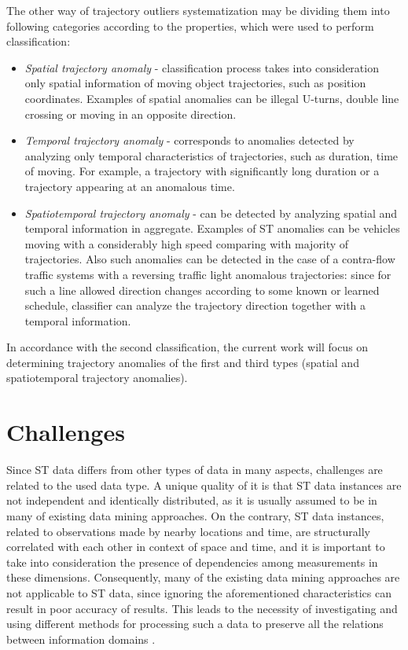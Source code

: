 The other way of trajectory outliers systematization may be dividing them into following categories according to the properties, which were used to perform classification: 
\begin{itemize}
	\item \textit{Spatial trajectory anomaly} - classification process takes into consideration only spatial information of moving object trajectories, such as position coordinates. Examples of spatial anomalies can be illegal U-turns, double line crossing or moving in an opposite direction.
	\item \textit{Temporal trajectory anomaly} - corresponds to anomalies detected by analyzing only temporal characteristics of trajectories, such as duration, time of moving. For example, a trajectory with significantly long duration or a trajectory appearing at an anomalous time.
	\item \textit{Spatiotemporal trajectory anomaly} - can be detected by analyzing spatial and temporal information in aggregate. Examples of ST anomalies can be vehicles moving with a considerably high speed comparing with majority of trajectories. Also such anomalies can be detected in the case of a contra-flow traffic systems with a reversing traffic light anomalous trajectories: since for such a line allowed direction changes according to some known or learned schedule, classifier can analyze the trajectory direction together with a temporal information.
\end{itemize}

In accordance with the second classification, the current work will focus on determining trajectory anomalies of the first and third types (spatial and spatiotemporal trajectory anomalies).


\section{Challenges}
Since ST data differs from other types of data in many aspects, challenges are related to the used data type. A unique quality of it is that ST data instances are not independent and identically distributed, as it is usually assumed to be in many of existing data mining approaches. On the contrary, ST data instances, related to observations made by nearby locations and time, are structurally correlated with each other in context of space and time, and it is important to take into consideration the presence of dependencies among measurements in these dimensions. Consequently, many of the existing data mining approaches are not applicable to ST data, since ignoring the aforementioned characteristics can result in poor accuracy of results. This leads to the necessity of investigating and using different methods for processing such a data to preserve all the relations between information domains \cite{article:1_survey_stdm}.

